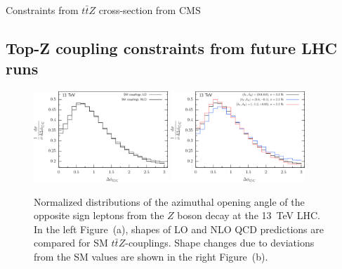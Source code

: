\documentclass[preprint]{JHEP3} %
\def\ttbZ{t\bar{t}Z}
\begin{document}
Constraints from $t\bar{t}Z$ cross-section from CMS \\

\subsection{Top-Z coupling constraints from future LHC runs}



\begin{figure}[t]
\centering %
\includegraphics[width=0.45\textwidth]{./LHC_53_Fig17a.eps}
\hfill
\includegraphics[width=0.45\textwidth]{./LHC_53_Fig17b.eps}
\caption{\label{fig:v}
Normalized distributions of the azimuthal opening angle of the opposite sign leptons from the $Z$ boson decay at the 13~TeV LHC.
In the left Figure~(a), shapes of LO and NLO QCD predictions are compared for SM $\ttbZ$-couplings.
Shape changes due to deviations from the SM values are shown in the right Figure~(b).
}
\end{figure}
\end{document}

